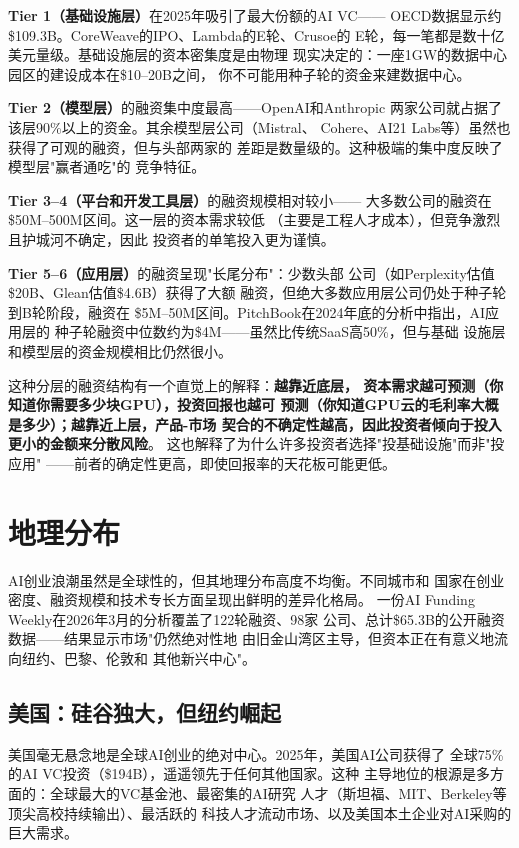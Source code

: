 \textbf{Tier 1（基础设施层）}在2025年吸引了最大份额的AI VC——
OECD数据显示约\$109.3B。CoreWeave的IPO、Lambda的E轮、Crusoe的
E轮，每一笔都是数十亿美元量级。基础设施层的资本密集度是由物理
现实决定的：一座1GW的数据中心园区的建设成本在\$10--20B之间，
你不可能用种子轮的资金来建数据中心。

\textbf{Tier 2（模型层）}的融资集中度最高——OpenAI和Anthropic
两家公司就占据了该层90\%以上的资金。其余模型层公司（Mistral、
Cohere、AI21 Labs等）虽然也获得了可观的融资，但与头部两家的
差距是数量级的。这种极端的集中度反映了模型层"赢者通吃"的
竞争特征。

\textbf{Tier 3--4（平台和开发工具层）}的融资规模相对较小——
大多数公司的融资在\$50M--500M区间。这一层的资本需求较低
（主要是工程人才成本），但竞争激烈且护城河不确定，因此
投资者的单笔投入更为谨慎。

\textbf{Tier 5--6（应用层）}的融资呈现"长尾分布"：少数头部
公司（如Perplexity估值\$20B、Glean估值\$4.6B）获得了大额
融资，但绝大多数应用层公司仍处于种子轮到B轮阶段，融资在
\$5M--50M区间。PitchBook在2024年底的分析中指出，AI应用层的
种子轮融资中位数约为\$4M——虽然比传统SaaS高50\%，但与基础
设施层和模型层的资金规模相比仍然很小。

这种分层的融资结构有一个直觉上的解释：\textbf{越靠近底层，
资本需求越可预测（你知道你需要多少块GPU），投资回报也越可
预测（你知道GPU云的毛利率大概是多少）；越靠近上层，产品-市场
契合的不确定性越高，因此投资者倾向于投入更小的金额来分散风险}。
这也解释了为什么许多投资者选择"投基础设施"而非"投应用"
——前者的确定性更高，即使回报率的天花板可能更低。


\section{地理分布}
\label{sec:overview-geography}

AI创业浪潮虽然是全球性的，但其地理分布高度不均衡。不同城市和
国家在创业密度、融资规模和技术专长方面呈现出鲜明的差异化格局。
一份AI Funding Weekly在2026年3月的分析覆盖了122轮融资、98家
公司、总计\$65.3B的公开融资数据——结果显示市场"仍然绝对性地
由旧金山湾区主导，但资本正在有意义地流向纽约、巴黎、伦敦和
其他新兴中心"。

\subsection{美国：硅谷独大，但纽约崛起}

美国毫无悬念地是全球AI创业的绝对中心。2025年，美国AI公司获得了
全球75\%的AI VC投资（\$194B），遥遥领先于任何其他国家。这种
主导地位的根源是多方面的：全球最大的VC基金池、最密集的AI研究
人才（斯坦福、MIT、Berkeley等顶尖高校持续输出）、最活跃的
科技人才流动市场、以及美国本土企业对AI采购的巨大需求。


